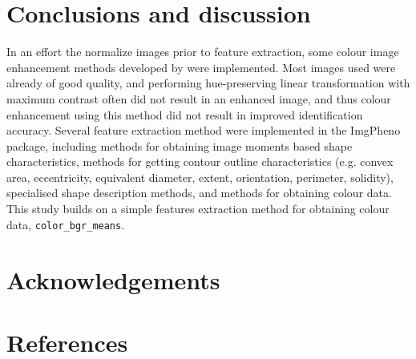 \documentclass[3p,twocolumn,10pt]{elsarticle}
\begin{document}
\section{Conclusions and discussion}
\label{sect:conclusion}

In an effort the normalize images prior to feature extraction, some colour image enhancement methods developed by \citet{Naik2003} were implemented. Most images used were already of good quality, and performing hue-preserving linear transformation with maximum contrast often did not result in an enhanced image, and thus colour enhancement using this method did not result in improved identification accuracy. Several feature extraction method were implemented in the ImgPheno package, including methods for obtaining image moments based shape characteristics, methods for getting contour outline characteristics (e.g. convex area, eccentricity, equivalent diameter, extent, orientation, perimeter, solidity), specialised shape description methods, and methods for obtaining colour data. This study builds on a simple features extraction method for obtaining colour data, \verb/color_bgr_means/.


\lipsum[1]

\section*{Acknowledgements}


\lipsum[1]



\section*{References}





\appendix
\onecolumn
\end{document}
